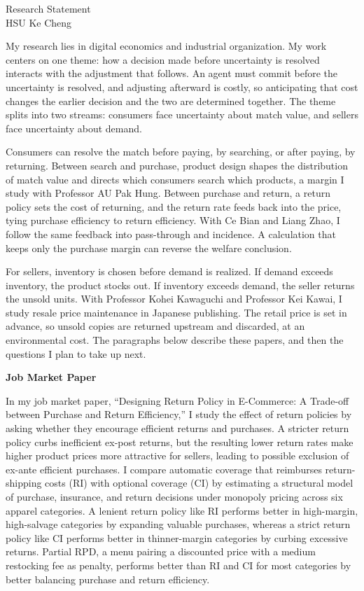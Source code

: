 \documentclass[11pt]{article}
\begin{document}
\begin{center}
{\Large Research Statement}\\[0.3em]
HSU Ke Cheng
\end{center}

My research lies in digital economics and industrial organization. My work centers on one theme: how a decision made before uncertainty is resolved interacts with the adjustment that follows. An agent must commit before the uncertainty is resolved, and adjusting afterward is costly, so anticipating that cost changes the earlier decision and the two are determined together. The theme splits into two streams: consumers face uncertainty about match value, and sellers face uncertainty about demand.

Consumers can resolve the match before paying, by searching, or after paying, by returning. Between search and purchase, product design shapes the distribution of match value and directs which consumers search which products, a margin I study with Professor AU Pak Hung. Between purchase and return, a return policy sets the cost of returning, and the return rate feeds back into the price, tying purchase efficiency to return efficiency. With Ce Bian and Liang Zhao, I follow the same feedback into pass-through and incidence. A calculation that keeps only the purchase margin can reverse the welfare conclusion.

For sellers, inventory is chosen before demand is realized. If demand exceeds inventory, the product stocks out. If inventory exceeds demand, the seller returns the unsold units. With Professor Kohei Kawaguchi and Professor Kei Kawai, I study resale price maintenance in Japanese publishing. The retail price is set in advance, so unsold copies are returned upstream and discarded, at an environmental cost. The paragraphs below describe these papers, and then the questions I plan to take up next.

\textbf{Job Market Paper}

In my job market paper, ``Designing Return Policy in E-Commerce: A Trade-off between Purchase and Return Efficiency,'' I study the effect of return policies by asking whether they encourage efficient returns and purchases. A stricter return policy curbs inefficient ex-post returns, but the resulting lower return rates make higher product prices more attractive for sellers, leading to possible exclusion of ex-ante efficient purchases. I compare automatic coverage that reimburses return-shipping costs (RI) with optional coverage (CI) by estimating a structural model of purchase, insurance, and return decisions under monopoly pricing across six apparel categories. A lenient return policy like RI performs better in high-margin, high-salvage categories by expanding valuable purchases, whereas a strict return policy like CI performs better in thinner-margin categories by curbing excessive returns. Partial RPD, a menu pairing a discounted price with a medium restocking fee as penalty, performs better than RI and CI for most categories by better balancing purchase and return efficiency.
\end{document}
